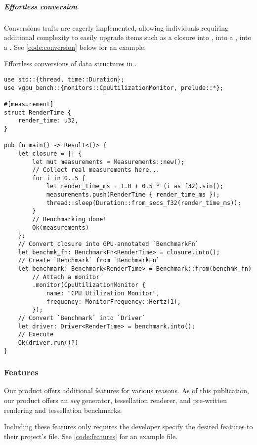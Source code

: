\subparagraph{Effortless conversion}
Conversions traits are eagerly implemented, allowing individuals requiring additional complexity to easily upgrade items such as a closure into , into a , into a . See \cref{code:conversion} below for an example.\medskip

\begin{snippet}
\caption{Effortless conversions of data structures in \toollinkedname.}\label{code:conversion}
\begin{verbatim}
use std::{thread, time::Duration};
use vgpu_bench::{monitors::CpuUtilizationMonitor, prelude::*};

#[measurement]
struct RenderTime {
    render_time: u32,
}

pub fn main() -> Result<()> {
    let closure = || {
        let mut measurements = Measurements::new();
        // Collect real measurements here...
        for i in 0..5 {
            let render_time_ms = 1.0 + 0.5 * (i as f32).sin();
            measurements.push(RenderTime { render_time_ms });
            thread::sleep(Duration::from_secs_f32(render_time_ms));
        }
        // Benchmarking done!
        Ok(measurements)
    };
    // Convert closure into GPU-annotated `BenchmarkFn`
    let benchmk_fn: BenchmarkFn<RenderTime> = closure.into();
    // Create `Benchmark` from `BenchmarkFn`
    let benchmark: Benchmark<RenderTime> = Benchmark::from(benchmk_fn)
        // Attach a monitor
        .monitor(CpuUtilizationMonitor {
            name: "CPU Utilization Monitor",
            frequency: MonitorFrequency::Hertz(1),
        });
    // Convert `Benchmark` into `Driver`
    let driver: Driver<RenderTime> = benchmark.into();
    // Execute
    Ok(driver.run()?)
}

\end{verbatim}
\end{snippet}


\subsubsection{Features}
Our product \toollinkedname offers additional features for various reasons. As of this publication, our product offers an \textit{svg} generator, tessellation renderer, and pre-written rendering and tessellation benchmarks.\medskip

Including these features only requires the developer specify the desired features to their project's  file. See \cref{code:features} for an example  file.

